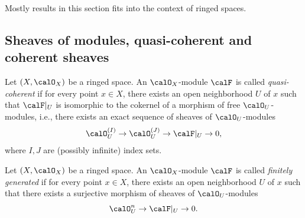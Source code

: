 Mostly results in this section fits into the context of ringed spaces.

\subsection{Sheaves of modules, quasi-coherent and coherent sheaves}



    \begin{definition}\label{def:quasi-coherent_sheaf}
        Let \((X,\calO_X)\) be a ringed space.
        An \(\calO_X\)-module \(\calF\) is called \emph{quasi-coherent} if for every point \(x\in X\), there exists an open neighborhood \(U\) of \(x\) such that \(\calF|_U\) is isomorphic to the cokernel of a morphism of free \(\calO_U\)-modules, i.e., there exists an exact sequence of sheaves of \(\calO_U\)-modules
        \[
            \calO_U^{(I)} \to \calO_U^{(J)} \to \calF|_U \to 0,
        \]
        where \(I,J\) are (possibly infinite) index sets.
    \end{definition}

    \begin{definition}\label{def:finitely_generated_sheaf}
        Let \((X,\calO_X)\) be a ringed space.
        An \(\calO_X\)-module \(\calF\) is called \emph{finitely generated} if for every point \(x\in X\), there exists an open neighborhood \(U\) of \(x\) such that there exists a surjective morphism of sheaves of \(\calO_U\)-modules
        \[
            \calO_U^n \to \calF|_U \to 0.
        \]
    \end{definition}

